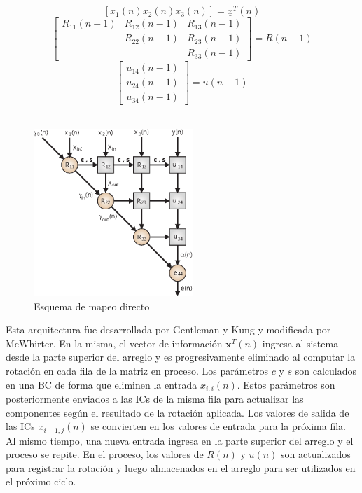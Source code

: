 \begin{figure}[h!]
        \centering
		\begin{minipage}[b]{0.4\textwidth}
			\footnotesize
			\[ [x_1(n) x_2(n) x_3(n)] = \underline{x}^T(n) \]
			\[ \left[
					\begin{array}{ccc}
						R_{11}(n-1) & R_{12}(n-1) & R_{13}(n-1) \\
							        & R_{22}(n-1) & R_{23}(n-1) \\
							        & 			  & R_{33}(n-1)
					\end{array}
				\right] = R(n-1) \]
			\[ \left[
					\begin{array}{c}
						u_{14}(n-1) \\
						u_{24}(n-1) \\
						u_{34}(n-1)
					\end{array}
				\right] = u(n-1) \]\vspace{1 cm}\\
			\normalsize
		\end{minipage}%
		\begin{minipage}[b]{0.6\textwidth}
        	\centering
        	\includegraphics[width=6cm]{./figures/C03-direct_mapping}
        \end{minipage}%
        \caption{Esquema de mapeo directo}
        \label{fig:direct_mapping}
\end{figure}

Esta arquitectura fue desarrollada por Gentleman y Kung y modificada por McWhirter. En la misma, el vector de información $\mathbf{x}^T(n)$ ingresa al sistema desde la parte superior del arreglo y es progresivamente eliminado al computar la rotación en cada fila de la matriz en proceso. Los parámetros $c$ y $s$ son calculados en una BC de forma que eliminen la entrada $x_{i,i}(n)$. Estos parámetros son posteriormente enviados a las ICs de la misma fila para actualizar las componentes según el resultado de la rotación aplicada. Los valores de salida de las ICs $x_{i+1,j}(n)$ se convierten en los valores de entrada para la próxima fila. Al mismo tiempo, una nueva entrada ingresa en la parte superior del arreglo y el proceso se repite. En el proceso, los valores de $R(n)$ y $u(n)$ son actualizados para registrar la rotación y luego almacenados en el arreglo para ser utilizados en el próximo ciclo.

